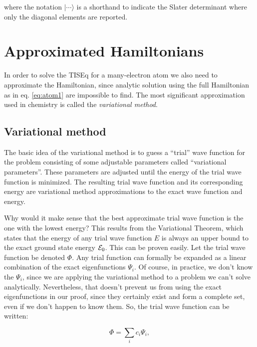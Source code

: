 \documentclass[
  9pt,
]{extbook}
\theoremstyle{definition}
\theoremstyle{definition}
\theoremstyle{definition}
\theoremstyle{remark}
\begin{document}
where the notation \(|\cdots\rangle\) is a shorthand to indicate the Slater determinant where only the diagonal elements are reported.

\hypertarget{approximated-hamiltonians}{%
\section{Approximated Hamiltonians}\label{approximated-hamiltonians}}

In order to solve the TISEq for a many-electron atom we also need to approximate the Hamiltonian, since analytic solution using the full Hamiltonian as in eq. \eqref{eq:atom1} are impossible to find. The most significant approximation used in chemistry is called the \emph{variational method}.

\hypertarget{variational-method}{%
\subsection{Variational method}\label{variational-method}}

The basic idea of the variational method is to guess a ``trial'' wave function for the problem consisting of some adjustable parameters called ``variational parameters''. These parameters are adjusted until the energy of the trial wave function is minimized. The resulting trial wave function and its corresponding energy are variational method approximations to the exact wave function and energy.

Why would it make sense that the best approximate trial wave function is the one with the lowest energy? This results from the Variational Theorem, which states that the energy of any trial wave function \(E\) is always an upper bound to the exact ground state energy \({\cal E}_0\). This can be proven easily. Let the trial wave function be denoted \(\Phi\). Any trial function can formally be expanded as a linear combination of the exact eigenfunctions \(\Psi_i\). Of course, in practice, we don't know the \(\Psi_i\), since we are applying the variational method to a problem we can't solve analytically. Nevertheless, that doesn't prevent us from using the exact eigenfunctions in our proof, since they certainly exist and form a complete set, even if we don't happen to know them. So, the trial wave function can be written:

\begin{equation}
\Phi = \sum_i c_i \Psi_i,
\label{eq:var1}
\end{equation}
\end{document}
